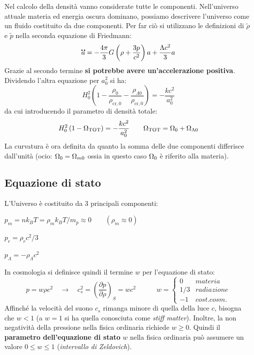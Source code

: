 Nel calcolo della densità vanno considerate tutte le componenti.
Nell'universo attuale materia ed energia oscura dominano, possiamo descrivere l'universo come un fluido costituito da due componenti. Per far ciò si utilizzano le definizioni di $\tilde{\rho}$ e $\tilde{p}$ nella seconda equazione di Friedmann:
$$
\accentset{\mbox{\large\bfseries ..}}{a}  =-\frac{4\pi}{3}G\left ( \rho+\frac{3p}{c^2} \right ) a + \frac{\Lambda c^2}{3}a
$$
Grazie al secondo termine \textbf{si potrebbe avere un'accelerazione positiva}.
Dividendo l'altra equazione per $a_0^2$ si ha:
\begin{equation}
    H_0^2 \left ( 1-\frac{\rho_0}{\rho_{\mathrm{cr},0}} -\frac{\rho_{\Lambda 0}}{\rho_{\mathrm{cr},0}} \right ) = -\frac{kc^2}{a_0^2}
\end{equation}
da cui introducendo il parametro di densità totale:
\begin{equation}
    H_0^2 \left ( 1-\Omega_{\mathrm{TOT}} \right ) = -\frac{kc^2}{a_0^2}\qquad \Omega_{\mathrm{TOT}}=\Omega_0+\Omega_{\Lambda 0} \label{eq:2omega0k}
\end{equation}
La curvatura è ora definita da quanto la somma delle due componenti differisce dall'unità (ocio: $\Omega_0 = \Omega_{m0}$ ossia in questo caso $\Omega_0$ è riferito alla materia). 


\subsection{Equazione di stato}
L'Universo è costituito da 3 principali componenti:

\begin{example}
$p_m=nk_B T = \rho_mk_B T/{m_p} \approx 0 \qquad ( \rho_m \approx 0) $
\end{example}
\begin{example}
$p_r=\rho_r c^2/3 $
\end{example}
\begin{example}
$p_\Lambda= -\rho_\Lambda c^2 $
\end{example}

In cosmologia si definisce quindi il termine $w$ per l'equazione di stato:
\begin{equation}
    p=w\rho c^2\quad\rightarrow \quad c_s^2=\left ( \frac{\partial p}{\partial \rho}\right )_{S}=wc^2 \qquad \quad w= \left\{\begin{matrix}
0& materia\\
1/3 & radiazione\\
-1 & cost. cosm.
\end{matrix}\right.
\end{equation}
Affinché la velocità del suono $c_s$ rimanga minore di quella della luce $c$, bisogna che $w<1 $ (a $w=1 $ si ha quella conosciuta come \textit{stiff matter}). Inoltre, la non negatività della pressione nella fisica ordinaria richiede $w\geq 0 $. Quindi il \textbf{parametro dell'equazione di stato} $w $ nella fisica ordinaria può assumere un valore $0\leq w\leq 1$ (\textit{intervallo di Zeldovich}).

